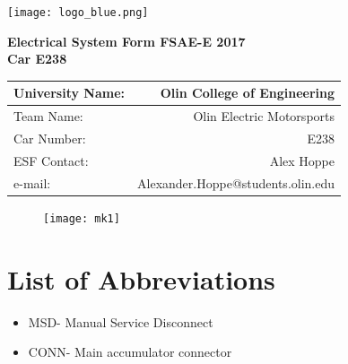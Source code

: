 \documentclass{article}
\begin{document}
\renewcommand{\headrulewidth}{0pt}
\chead{}
\rhead{} %
{}
\rfoot{\thepage}

\begin{titlepage}

    \centering
    \vfill
    \texttt{[image: logo\_blue.png]}

    {\bfseries\Large
        \vskip3cm
        Electrical System Form FSAE-E 2017\\
        Car E238\\
    }

    \begin{table}[H]
        \centering
        \label{my-label}
        \begin{tabular}{lr}
        University Name: & Olin College of Engineering \\ \hline
        Team Name: & Olin Electric Motorsports \\ \hline
        Car Number: & E238 \\ \hline
        ESF Contact: & Alex Hoppe \\ \hline
        e-mail: & Alexander.Hoppe@students.olin.edu \\ \hline
        \end{tabular}
    \end{table}
\vfill

\begin{figure}[H]
\centering
\texttt{[image: mk1]}
\end{figure}

\end{titlepage}

\tableofcontents
{}

\newpage
\listoffigures
{}

\newpage
\listoftables
{}

\newpage
\section*{List of Abbreviations} \label{list_of_abbreviations}
\begin{itemize}
    \item MSD- Manual Service Disconnect
    \item CONN- Main accumulator connector
\end{itemize}
\end{document}
